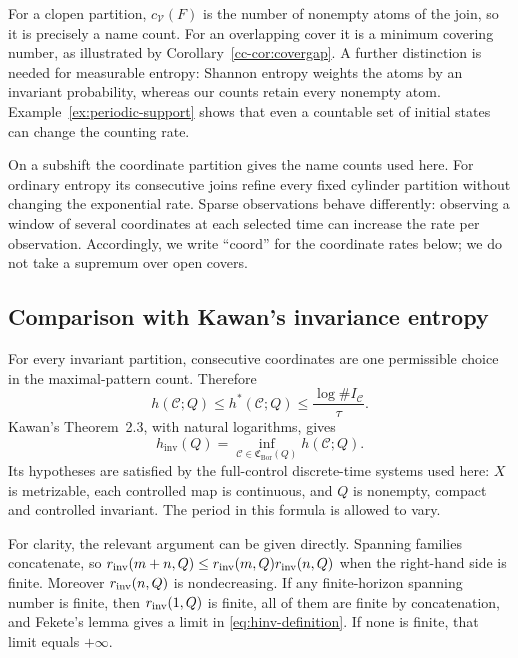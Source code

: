 \documentclass[11pt,reqno]{amsart}
\numberwithin{equation}{section}
\theoremstyle{definition}
\theoremstyle{definition}
\newcommand{\C}{\mathcal C}
\newcommand{\hpat}{h^{*}}
\newcommand{\hinv}{h_{\mathrm{inv}}}
\newcommand{\Bor}{\mathrm{Bor}}
\begin{document}
For a clopen partition, $c_{\mathcal V}(F)$ is the number of
nonempty atoms of the join, so it is precisely a name count. For an
overlapping cover it is a minimum covering number, as illustrated
by Corollary~\ref{cc-cor:covergap}. A further distinction is needed
for measurable entropy: Shannon entropy weights the atoms by an
invariant probability, whereas our counts retain every nonempty
atom. Example~\ref{ex:periodic-support} shows that even a countable
set of initial states can change the counting rate.

On a subshift the coordinate partition gives the name counts used
here. For ordinary entropy its consecutive joins refine every fixed
cylinder partition without changing the exponential rate. Sparse
observations behave differently: observing a window of several
coordinates at each selected time can increase the rate per
observation. Accordingly, we write ``$\mathrm{coord}$'' for the
coordinate rates below; we do not take a supremum over open covers.

\subsection{Comparison with Kawan's invariance entropy}
For every invariant partition, consecutive coordinates are one permissible
choice in the maximal-pattern count. Therefore
\begin{equation}\label{eq:ordinary-pattern-one-sided}
 h(\C;Q)\le\hpat(\C;Q)\le\frac{\log\#I_\C}{\tau}.
\end{equation}
Kawan's Theorem~2.3, with natural logarithms, gives
\begin{equation}\label{eq:kawan-characterization}
 \hinv(Q)=\inf_{\C\in\mathfrak C_{\Bor}(Q)}h(\C;Q).
\end{equation}
Its hypotheses are satisfied by the full-control discrete-time systems
used here: $X$ is metrizable, each controlled map is continuous, and
$Q$ is nonempty, compact and controlled invariant.
The period in this formula is allowed to vary.

For clarity, the relevant argument can be given directly. Spanning
families concatenate, so
$r_{\rm inv}(m+n,Q)\le r_{\rm inv}(m,Q)r_{\rm inv}(n,Q)$ when the
right-hand side is finite. Moreover $r_{\rm inv}(n,Q)$ is nondecreasing.
If any finite-horizon spanning number is finite, then $r_{\rm inv}(1,Q)$
is finite, all of them are finite by concatenation, and Fekete's lemma
gives a limit in \eqref{eq:hinv-definition}. If none is finite, that
limit equals $+\infty$.
\end{document}
